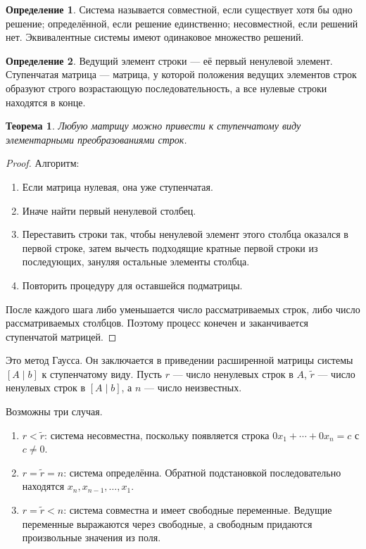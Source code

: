 \documentclass[12pt,a4paper,oneside,openany]{book}
\theoremstyle{definition}
\newtheorem{definition}{Определение}[chapter]
\theoremstyle{plain}
\newtheorem{theorem}{Теорема}[chapter]
\theoremstyle{remark}
\begin{document}
\begin{definition}
Система называется совместной, если существует хотя бы одно решение;
определённой, если решение единственно; несовместной, если решений нет.
Эквивалентные системы имеют одинаковое множество решений.
\end{definition}


\begin{definition}
Ведущий элемент строки --- её первый ненулевой элемент. Ступенчатая
матрица --- матрица, у которой положения ведущих элементов строк образуют
строго возрастающую последовательность, а все нулевые строки находятся в
конце.
\end{definition}

\begin{theorem}
Любую матрицу можно привести к ступенчатому виду элементарными
преобразованиями строк.
\end{theorem}

\begin{proof}
Алгоритм:
\begin{enumerate}[label=\Roman*.]
  \item Если матрица нулевая, она уже ступенчатая.
  \item Иначе найти первый ненулевой столбец.
  \item Переставить строки так, чтобы ненулевой элемент этого столбца
  оказался в первой строке, затем вычесть подходящие кратные первой строки
  из последующих, зануляя остальные элементы столбца.
  \item Повторить процедуру для оставшейся подматрицы.
\end{enumerate}
После каждого шага либо уменьшается число рассматриваемых строк, либо
число рассматриваемых столбцов. Поэтому процесс конечен и заканчивается
ступенчатой матрицей.
\end{proof}

Это метод Гаусса. Он заключается в приведении расширенной матрицы системы
$[A\mid b]$ к ступенчатому виду. Пусть $r$ --- число ненулевых строк в
$A$, $\widetilde r$ --- число ненулевых строк в $[A\mid b]$, а $n$ ---
число неизвестных.


Возможны три случая.
\begin{enumerate}[label=\arabic*)]
  \item $r<\widetilde r$: система несовместна, поскольку появляется
  строка $0x_1+\cdots+0x_n=c$ с $c\ne0$.
  \item $r=\widetilde r=n$: система определённа. Обратной подстановкой
  последовательно находятся $x_n,x_{n-1},\ldots,x_1$.
  \item $r=\widetilde r<n$: система совместна и имеет свободные
  переменные. Ведущие переменные выражаются через свободные, а свободным
  придаются произвольные значения из поля.
\end{enumerate}
\end{document}
